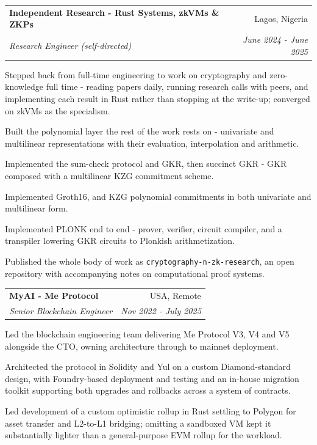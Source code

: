 \documentclass[11pt,a4paper]{article}
\makeatletter
\newcommand{\cventry}[4]{%
  \begin{tabular*}{\linewidth}[t]{@{\extracolsep{\fill}}l r@{}}
    \textbf{#1} & #2 \\
    \textit{#3} & \textit{#4}
  \end{tabular*}%
}
\makeatother
\begin{document}
\begin{cventries}
\item \cventry{Independent Research - Rust Systems, zkVMs \& ZKPs}{Lagos, Nigeria}
              {Research Engineer (self-directed)}{June 2024 - June 2025}
\begin{cvbullets}
  \item Stepped back from full-time engineering to work on cryptography and zero-knowledge full time -
        reading papers daily, running research calls with peers, and implementing each result in Rust
        rather than stopping at the write-up; converged on zkVMs as the specialism.
  \item Built the polynomial layer the rest of the work rests on - univariate and multilinear
        representations with their evaluation, interpolation and arithmetic.
  \item Implemented the sum-check protocol and GKR, then succinct GKR - GKR composed with a multilinear
        KZG commitment scheme.
  \item Implemented Groth16, and KZG polynomial commitments in both univariate and multilinear form.
  \item Implemented PLONK end to end - prover, verifier, circuit compiler, and a transpiler lowering
        GKR circuits to Plonkish arithmetization.
  \item Published the whole body of work as \texttt{cryptography-n-zk-research}, an open repository with
        accompanying notes on computational proof systems.
\end{cvbullets}


\item \cventry{MyAI - Me Protocol}{USA, Remote}
              {Senior Blockchain Engineer}{Nov 2022 - July 2025}
\begin{cvbullets}
  \item Led the blockchain engineering team delivering Me Protocol V3, V4 and V5 alongside the CTO,
        owning architecture through to mainnet deployment.
  \item Architected the protocol in Solidity and Yul on a custom Diamond-standard design, with
        Foundry-based deployment and testing and an in-house migration toolkit supporting both upgrades
        and rollbacks across a system of contracts.
  \item Led development of a custom optimistic rollup in Rust settling to Polygon for asset transfer and
        L2-to-L1 bridging; omitting a sandboxed VM kept it substantially lighter than a general-purpose
        EVM rollup for the workload.
\end{cvbullets}


\end{cventries}
\end{document}
